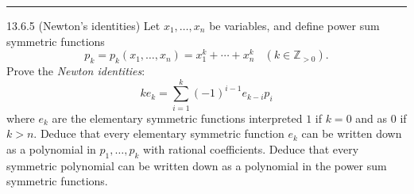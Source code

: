 \documentclass[a4paper, 12pt]{article}
\begin{document}
\noindent\rule{7in}{2.8pt}
\begin{problem}{13.6.5 (Newton's identities)}
Let \(x_1,\ldots, x_n\) be variables, and define power sum symmetric functions
\[p_k=p_k(x_1,\ldots,x_n)=x_1^k+\cdots+x_n^k\ \ \ \ (k\in \mathbb{Z}_{>0}).\]
Prove the \textit{Newton identities}:
\[ke_k=\sum_{i=1}^k(-1)^{i-1}e_{k-i}p_i\]
where \(e_k\) are the elementary symmetric functions interpreted \(1\) if \(k=0\) and as \(0\) if \(k>n\). Deduce that every elementary symmetric function \(e_k\) can be written down as a polynomial in \(p_1,\ldots, p_k\) with rational coefficients. Deduce that every symmetric polynomial can be written down as a polynomial in the power sum symmetric functions.
\end{problem}
\begin{solution}

\end{solution}
\end{document}
